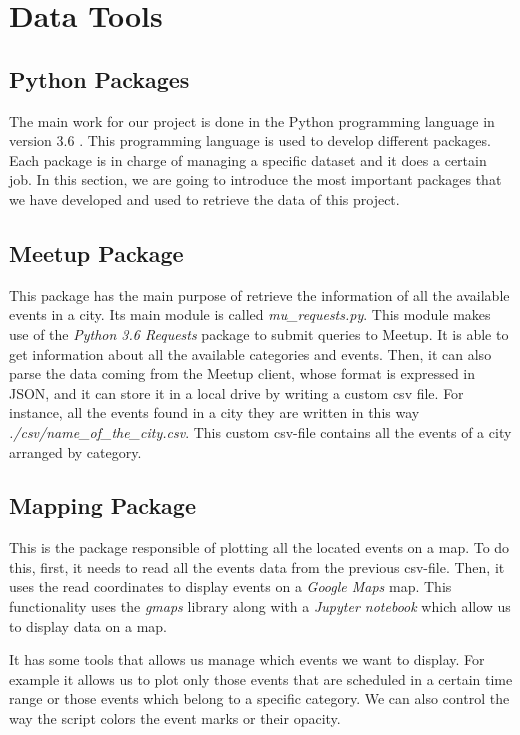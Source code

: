 \section{Data Tools}\label{sec:toolsanddata}
\subsection{Python Packages} 
The main work for our project is done in the Python programming language in version 3.6 \cite{python}. This programming language is used to develop different packages. Each package is in charge of managing a specific dataset and it does a certain job. In this section, we are going to introduce the most important packages that we have developed and used to retrieve the data of this project.

\subsection{Meetup Package}
This package has the main purpose of retrieve the information of all the available events in a city. Its main module is called \textit{mu\_requests.py}. This module makes use of the \textit{Python 3.6 Requests} package to submit queries to Meetup. It is able to get information about all the available categories and events. Then, it can also parse the data coming from the Meetup client, whose format is expressed in JSON, and it can store it in a local drive by writing a custom csv file. For instance, all the events found in a city they are written in this way \textit{./csv/name\_of\_the\_city.csv}. This custom csv-file contains all the events of a city arranged by category.

\subsection{Mapping Package}
This is the package responsible of plotting all the located events on a map. To do this, first, it needs to read all the events data from the previous csv-file. Then, it uses the read coordinates to display events on a \emph{Google Maps} map. This functionality uses the \textit{gmaps} library along with a \textit{Jupyter notebook} which allow us to display data on a map.

It has some tools that allows us manage which events we want to display. For example it allows us to plot only those events that are scheduled in a certain time range or those events which belong to a specific category. We can also control the way the script colors the event marks or their opacity.

